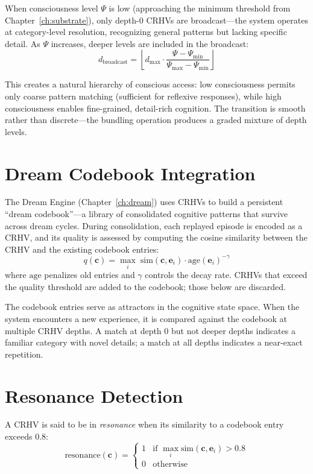 \documentclass[12pt]{book}
\begin{document}
When consciousness level $\Psi$ is low (approaching the minimum threshold from Chapter~\ref{ch:substrate}), only depth-0 CRHVs are broadcast---the system operates at category-level resolution, recognizing general patterns but lacking specific detail. As $\Psi$ increases, deeper levels are included in the broadcast:
\begin{equation}
d_{\text{broadcast}} = \left\lfloor d_{\max} \cdot \frac{\Psi - \Psi_{\min}}{\Psi_{\max} - \Psi_{\min}} \right\rfloor
\end{equation}

This creates a natural hierarchy of conscious access: low consciousness permits only coarse pattern matching (sufficient for reflexive responses), while high consciousness enables fine-grained, detail-rich cognition. The transition is smooth rather than discrete---the bundling operation produces a graded mixture of depth levels.

\section{Dream Codebook Integration}

The Dream Engine (Chapter~\ref{ch:dream}) uses CRHVs to build a persistent ``dream codebook''---a library of consolidated cognitive patterns that survive across dream cycles. During consolidation, each replayed episode is encoded as a CRHV, and its quality is assessed by computing the cosine similarity between the CRHV and the existing codebook entries:
\begin{equation}
q(\mathbf{c}) = \max_{i} \; \text{sim}(\mathbf{c}, \mathbf{e}_i) \cdot \text{age}(\mathbf{e}_i)^{-\gamma}
\end{equation}
where $\text{age}$ penalizes old entries and $\gamma$ controls the decay rate. CRHVs that exceed the quality threshold are added to the codebook; those below are discarded.

The codebook entries serve as attractors in the cognitive state space. When the system encounters a new experience, it is compared against the codebook at multiple CRHV depths. A match at depth 0 but not deeper depths indicates a familiar category with novel details; a match at all depths indicates a near-exact repetition.

\section{Resonance Detection}

A CRHV is said to be in \textit{resonance} when its similarity to a codebook entry exceeds 0.8:
\begin{equation}
\text{resonance}(\mathbf{c}) = \begin{cases} 1 & \text{if } \max_i \text{sim}(\mathbf{c}, \mathbf{e}_i) > 0.8 \\ 0 & \text{otherwise} \end{cases}
\end{equation}
\end{document}

